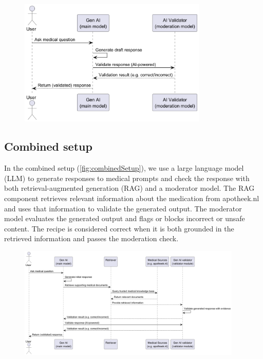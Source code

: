 \begin{figure}[H]
    \includegraphics[width=0.8\textwidth]{figures/moderatorSetupSequenceDiagram.png}
    \label{fig:moderatorSetup}
\end{figure}

\subsection{Combined setup}

In the combined setup (\autoref{fig:combinedSetup}), we use a large language model (LLM) to generate responses to medical prompts and check the response with both retrieval-augmented generation (RAG) and a moderator model.
The RAG component retrieves relevant information about the medication from apotheek.nl and uses that information to validate the generated output.
The moderator model evaluates the generated output and flags or blocks incorrect or unsafe content.
The recipe is considered correct when it is both grounded in the retrieved information and passes the moderation check.

\begin{figure}[H]
    \includegraphics[width=0.95\textwidth]{figures/combinedSetupSequenceDiagram.png}
    \label{fig:combinedSetup}
\end{figure}

